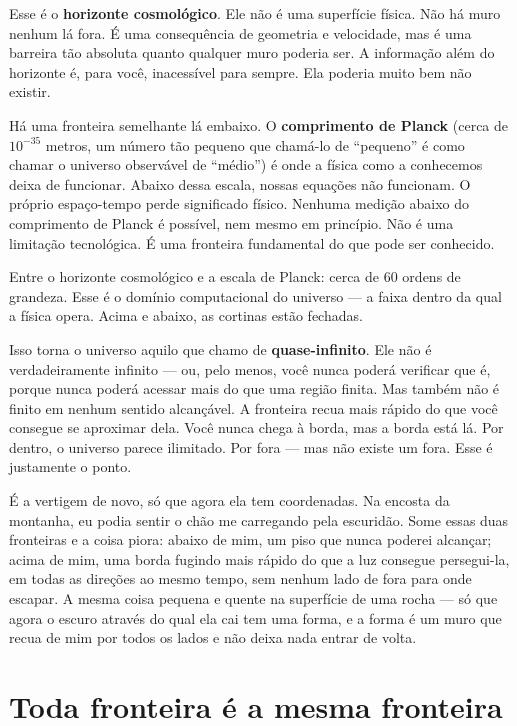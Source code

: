 \documentclass[11pt, twoside, openright]{book}
\begin{document}
Esse é o \textbf{horizonte cosmológico}. Ele não é uma superfície física. Não há muro nenhum lá fora. É uma consequência de geometria e velocidade, mas é uma barreira tão absoluta quanto qualquer muro poderia ser. A informação além do horizonte é, para você, inacessível para sempre. Ela poderia muito bem não existir.

Há uma fronteira semelhante lá embaixo. O \textbf{comprimento de Planck} (cerca de $10^{-35}$ metros, um número tão pequeno que chamá-lo de ``pequeno'' é como chamar o universo observável de ``médio'') é onde a física como a conhecemos deixa de funcionar. Abaixo dessa escala, nossas equações não funcionam. O próprio espaço-tempo perde significado físico. Nenhuma medição abaixo do comprimento de Planck é possível, nem mesmo em princípio. Não é uma limitação tecnológica. É uma fronteira fundamental do que pode ser conhecido.

Entre o horizonte cosmológico e a escala de Planck: cerca de 60 ordens de grandeza. Esse é o domínio computacional do universo --- a faixa dentro da qual a física opera. Acima e abaixo, as cortinas estão fechadas.

Isso torna o universo aquilo que chamo de \textbf{quase-infinito}. Ele não é verdadeiramente infinito --- ou, pelo menos, você nunca poderá verificar que é, porque nunca poderá acessar mais do que uma região finita. Mas também não é finito em nenhum sentido alcançável. A fronteira recua mais rápido do que você consegue se aproximar dela. Você nunca chega à borda, mas a borda está lá. Por dentro, o universo parece ilimitado. Por fora --- mas não existe um fora. Esse é justamente o ponto.

É a vertigem de novo, só que agora ela tem coordenadas. Na encosta da montanha, eu podia sentir o chão me carregando pela escuridão. Some essas duas fronteiras e a coisa piora: abaixo de mim, um piso que nunca poderei alcançar; acima de mim, uma borda fugindo mais rápido do que a luz consegue persegui-la, em todas as direções ao mesmo tempo, sem nenhum lado de fora para onde escapar. A mesma coisa pequena e quente na superfície de uma rocha --- só que agora o escuro através do qual ela cai tem uma forma, e a forma é um muro que recua de mim por todos os lados e não deixa nada entrar de volta.


\section*{Toda fronteira é a mesma fronteira}
\end{document}
